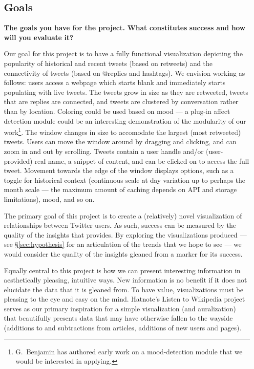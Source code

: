 \subsection{Goals}
\textbf{The goals you have for the project. What constitutes success and how will you evaluate it?}

Our goal for this project is to have a fully functional visualization depicting the popularity of historical and recent
tweets (based on retweets) and the connectivity of tweets (based on @replies and hashtags).
We envision \sys working as follows: users access a webpage which starts blank and immediately starts populating with
live tweets. The tweets grow in size as they are retweeted, tweets that are replies are connected, and tweets are
clustered by conversation rather than by location. Coloring could be used based on mood --- a plug-in affect detection
module could be an interesting demonstration of the modularity of our work\footnote{G.\ Benjamin has authored early work on
a mood-detection module that we would be interested in applying.}. The window changes in size to accomodate the
largest (most retweeted) tweets. Users can move the window around by dragging and clicking, and can zoom in and out
by scrolling. Tweets contain a user handle and/or (user-provided) real name, a snippet of content, and can be clicked on
to access the full tweet. Movement towards the edge of the window displays options, such as a toggle for historical
context (continuous scale at day variation up to perhaps the month scale --- the maximum amount of caching depends on
API and storage limitations), mood, and so on.

The primary goal of this project is to create a (relatively) novel visualization of relationships between Twitter users.
As such, success can be measured by the quality of the insights that \sys provides. By exploring the visualizations
produced --- see \S \ref{sec:hypothesis} for an articulation of the trends that we hope to see ---
we would consider the quality of the insights gleaned from \sys a marker for its success.

Equally central to this project is how we can present interesting information in aesthetically pleasing, intuitive ways.
New information is no benefit if it does not elucidate the data that it is gleaned from. To have value, visualizations
must be pleasing to the eye and easy on the mind. Hatnote's Listen to Wikipedia project~\cite{listenwiki} serves as our
primary inspiration for a simple visualization (and auralization) that beautifully presents data that may have otherwise
fallen to the wayside (additions to and subtractions from articles, additions of new users and pages).


